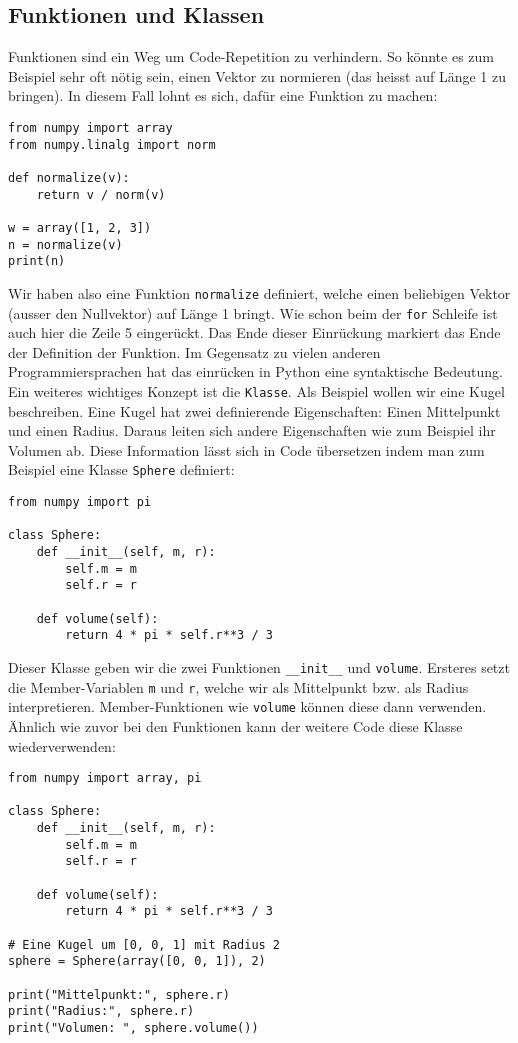 \subsection{Funktionen und Klassen}
Funktionen sind ein Weg um Code-Repetition zu verhindern.
So könnte es zum Beispiel sehr oft nötig sein, einen Vektor zu normieren (das heisst auf Länge 1 zu bringen).
In diesem Fall lohnt es sich, dafür eine Funktion zu machen:
\begin{lstlisting}[style=python]
from numpy import array
from numpy.linalg import norm

def normalize(v):
	return v / norm(v)

w = array([1, 2, 3])
n = normalize(v)
print(n)
\end{lstlisting}
Wir haben also eine Funktion \texttt{normalize} definiert, welche einen beliebigen Vektor (ausser den Nullvektor) auf Länge 1 bringt.
Wie schon beim der \texttt{for} Schleife ist auch hier die Zeile 5 eingerückt.
Das Ende dieser Einrückung markiert das Ende der Definition der Funktion.
Im Gegensatz zu vielen anderen Programmiersprachen hat das einrücken in Python eine syntaktische Bedeutung.
Ein weiteres wichtiges Konzept ist die \texttt{Klasse}.
Als Beispiel wollen wir eine Kugel beschreiben.
Eine Kugel hat zwei definierende Eigenschaften: Einen Mittelpunkt und einen Radius.
Daraus leiten sich andere Eigenschaften wie zum Beispiel ihr Volumen ab.
Diese Information lässt sich in Code übersetzen indem man zum Beispiel eine Klasse \texttt{Sphere} definiert:
\begin{lstlisting}[style=python]
from numpy import pi

class Sphere:
	def __init__(self, m, r):
		self.m = m
		self.r = r

	def volume(self):
		return 4 * pi * self.r**3 / 3
\end{lstlisting}
Dieser Klasse geben wir die zwei Funktionen \texttt{\_\_init\_\_} und \texttt{volume}.
Ersteres setzt die Member-Variablen \texttt{m} und \texttt{r}, welche wir als Mittelpunkt bzw. als Radius interpretieren.
Member-Funktionen wie \texttt{volume} können diese dann verwenden.
Ähnlich wie zuvor bei den Funktionen kann der weitere Code diese Klasse wiederverwenden:
\begin{lstlisting}[style=python]
from numpy import array, pi

class Sphere:
	def __init__(self, m, r):
		self.m = m
		self.r = r

	def volume(self):
		return 4 * pi * self.r**3 / 3

# Eine Kugel um [0, 0, 1] mit Radius 2
sphere = Sphere(array([0, 0, 1]), 2)

print("Mittelpunkt:", sphere.r)
print("Radius:", sphere.r)
print("Volumen: ", sphere.volume())
\end{lstlisting}

